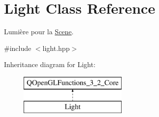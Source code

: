 \hypertarget{class_light}{\section{Light Class Reference}
\label{class_light}
}


Lumière pour la \hyperlink{class_scene}{Scene}.  




{\ttfamily \#include $<$light.\+hpp$>$}

Inheritance diagram for Light\+:\begin{figure}[H]
\begin{center}
\leavevmode
\includegraphics[height=2.000000cm]{class_light}
\end{center}
\end{figure}
